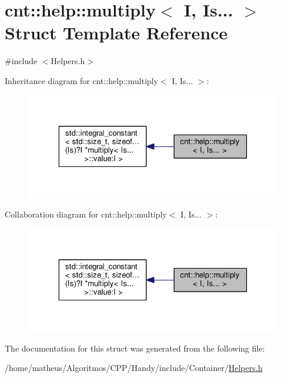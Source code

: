 \hypertarget{structcnt_1_1help_1_1multiply_3_01I_00_01Is_8_8_8_01_4}{}\section{cnt\+:\+:help\+:\+:multiply$<$ I, Is... $>$ Struct Template Reference}
\label{structcnt_1_1help_1_1multiply_3_01I_00_01Is_8_8_8_01_4}


{\ttfamily \#include $<$Helpers.\+h$>$}



Inheritance diagram for cnt\+:\+:help\+:\+:multiply$<$ I, Is... $>$\+:\nopagebreak
\begin{figure}[H]
\begin{center}
\leavevmode
\includegraphics[width=323pt]{structcnt_1_1help_1_1multiply_3_01I_00_01Is_8_8_8_01_4__inherit__graph}
\end{center}
\end{figure}


Collaboration diagram for cnt\+:\+:help\+:\+:multiply$<$ I, Is... $>$\+:\nopagebreak
\begin{figure}[H]
\begin{center}
\leavevmode
\includegraphics[width=323pt]{structcnt_1_1help_1_1multiply_3_01I_00_01Is_8_8_8_01_4__coll__graph}
\end{center}
\end{figure}


The documentation for this struct was generated from the following file\+:\begin{DoxyCompactItemize}
\item 
/home/matheus/\+Algoritmos/\+C\+P\+P/\+Handy/include/\+Container/\hyperlink{Container_2Helpers_8h}{Helpers.\+h}\end{DoxyCompactItemize}
